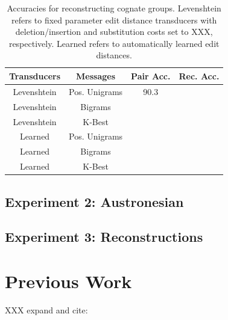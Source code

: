 \documentclass[11pt,a4paper]{article}
\begin{document}
\begin{table}
  \begin{tabular}{|c|c|c|c|}
    Transducers & Messages & Pair Acc. & Rec. Acc.\\
    \hline
    \hline
    Levenshtein&Pos. Unigrams & 90.3 & \\
    Levenshtein&Bigrams & & \\
    Levenshtein&K-Best & & \\
    \hline
    Learned&Pos. Unigrams & & \\
    Learned&Bigrams & & \\
    Learned&K-Best & & \\
  \end{tabular}
  \caption{Accuracies for reconstructing cognate groups. Levenshtein
  refers to fixed parameter edit distance transducers with
  deletion/insertion and substitution costs set to XXX, respectively.
  Learned refers to automatically learned edit distances.}
  \label{tbl:exp1}
\end{table}

\subsection{Experiment 2: Austronesian}

\subsection{Experiment 3: Reconstructions}


\section{Previous Work}
XXX expand and cite:
\end{document}
